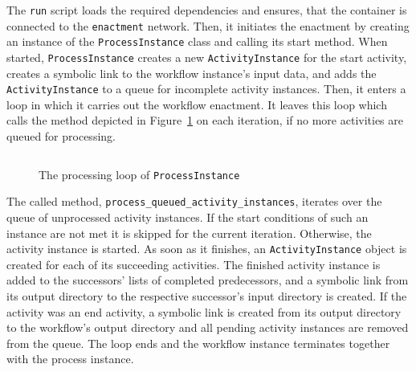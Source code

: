     The \texttt{run} script loads the required dependencies and ensures, that the container is connected to the \texttt{enactment} network. Then, it initiates the enactment by creating an instance of the \texttt{ProcessInstance} class and calling its start method.
    When started, \texttt{ProcessInstance} creates a new \texttt{ActivityInstance} for the start activity, creates a symbolic link to the workflow instance's input data, and adds the \texttt{ActivityInstance} to a queue for incomplete activity instances. Then, it enters a loop in which it carries out the workflow enactment. It leaves this loop which calls the method depicted in Figure~\ref{fig:the_processing_loop_of_process_instance} on each iteration, if no more activities are queued for processing.

    \begin{figure}[h]
      \inputminted[firstline=26,lastline=43,fontsize=\footnotesize,linenos=true,numberblanklines=true,showspaces=false,breaklines=true,baselinestretch=1,gobble=2]{ruby}{../code/wf_base/process_instance.rb}
      \caption[The processing loop of ProcessInstance]{The processing loop of \texttt{ProcessInstance}}
      \label{fig:the_processing_loop_of_process_instance}
    \end{figure}

    The called method, \texttt{process\_queued\_activity\_instances}, iterates over the queue of unprocessed activity instances. If the start conditions of such an instance are not met it is skipped for the current iteration. Otherwise, the activity instance is started. As soon as it finishes, an \texttt{ActivityInstance} object is created for each of its succeeding activities. The finished activity instance is added to the successors' lists of completed predecessors, and a symbolic link from its output directory to the respective successor's input directory is created. If the activity was an end activity, a symbolic link is created from its output directory to the workflow's output directory and all pending activity instances are removed from the queue. The loop ends and the workflow instance terminates together with the process instance.

